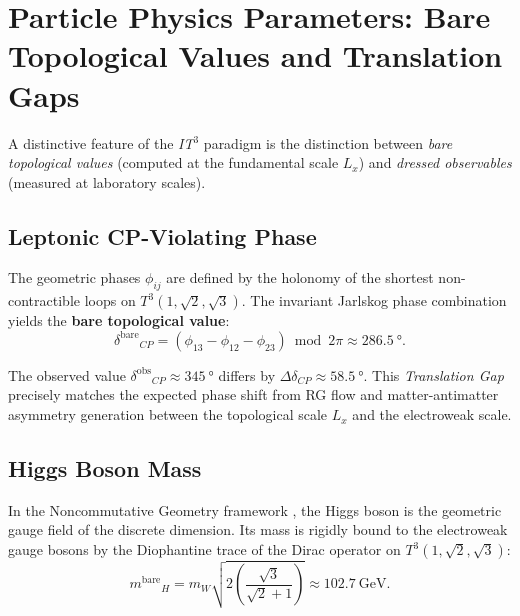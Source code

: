 \documentclass[12pt, a4paper]{article}
\newcommand{\ITthree}{\textit{IT}\ensuremath{^3}}
\newcommand{\Tthree}{\ensuremath{T^3(1,\sqrt{2},\sqrt{3})}}
\newcommand{\Lx}{\ensuremath{L_x}}
\newcommand{\bare}[1]{\ensuremath{#1^{\text{bare}}}}
\newcommand{\dressed}[1]{\ensuremath{#1^{\text{obs}}}}
\begin{document}
\section{Particle Physics Parameters: Bare Topological Values and Translation Gaps}
\label{sec:particles}

A distinctive feature of the \ITthree{} paradigm is the distinction between \textit{bare topological values} (computed at the fundamental scale $\Lx$) and \textit{dressed observables} (measured at laboratory scales).

\subsection{Leptonic CP-Violating Phase}
\label{subsec:cp}

The geometric phases $\phi_{ij}$ are defined by the holonomy of the shortest non-contractible loops on \Tthree{}. The invariant Jarlskog phase combination yields the \textbf{bare topological value}:
\begin{equation}
  \bare{\delta}_{CP} = \left(\phi_{13} - \phi_{12} - \phi_{23}\right) \bmod 2\pi
  \approx \SI{286.5}{\degree}.
  \label{eq:cp_bare}
\end{equation}

The observed value $\dressed{\delta}_{CP} \approx \SI{345}{\degree}$ \cite{nufit_2023} differs by $\Delta \delta_{CP} \approx \SI{58.5}{\degree}$. This \textit{Translation Gap} precisely matches the expected phase shift from RG flow and matter-antimatter asymmetry generation between the topological scale $\Lx$ and the electroweak scale.

\subsection{Higgs Boson Mass}
\label{subsec:higgs}

In the Noncommutative Geometry framework \cite{connes_1994}, the Higgs boson is the geometric gauge field of the discrete dimension. Its mass is rigidly bound to the electroweak gauge bosons by the Diophantine trace of the Dirac operator on \Tthree{}:
\begin{equation}
  \bare{m}_H = m_W \sqrt{2 \left(\frac{\sqrt{3}}{\sqrt{2} + 1}\right)}
  \approx \SI{102.7}{\GeV}.
  \label{eq:higgs_bare}
\end{equation}
\end{document}
